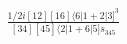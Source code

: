\documentclass[varwidth, border=5pt]{standalone}
\begin{document}
\begin{my}
$\begin{gathered}
\scriptscriptstyle\frac{1/2i[12][16]\langle6|1+2|3]^3}{[34][45]\langle2|1+6|5]s_{345}}
\end{gathered}$
\end{my}
\end{document}

